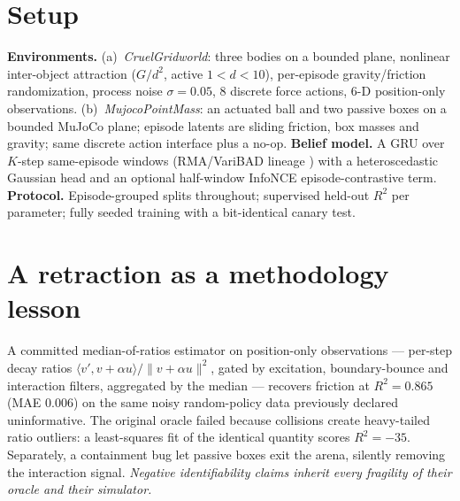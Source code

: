 \documentclass[10pt]{article}
\begin{document}
\section{Setup}
\textbf{Environments.} (a)~\emph{CruelGridworld}: three bodies on a bounded plane,
nonlinear inter-object attraction ($G/d^2$, active $1{<}d{<}10$), per-episode
gravity/friction randomization, process noise $\sigma{=}0.05$, 8 discrete force
actions, 6-D position-only observations. (b)~\emph{MujocoPointMass}: an actuated
ball and two passive boxes on a bounded MuJoCo plane; episode latents are sliding
friction, box masses and gravity; same discrete action interface plus a no-op.
\textbf{Belief model.} A GRU over $K$-step same-episode windows (RMA/VariBAD
lineage \citep{kumar2021rma,zintgraf2020varibad}) with a heteroscedastic Gaussian
head and an optional half-window InfoNCE episode-contrastive term.
\textbf{Protocol.} Episode-grouped splits throughout; supervised held-out $R^2$
per parameter; fully seeded training with a bit-identical canary test.

\section{A retraction as a methodology lesson}
A committed median-of-ratios estimator on position-only observations --- per-step
decay ratios $\langle v', v{+}\alpha u\rangle/\lVert v{+}\alpha u\rVert^2$, gated
by excitation, boundary-bounce and interaction filters, aggregated by the median
--- recovers friction at $R^2{=}0.865$ (MAE $0.006$) on the same noisy
random-policy data previously declared uninformative. The original oracle failed
because collisions create heavy-tailed ratio outliers: a least-squares fit of the
identical quantity scores $R^2{=}-35$. Separately, a containment bug let passive
boxes exit the arena, silently removing the interaction signal. \emph{Negative
identifiability claims inherit every fragility of their oracle and their
simulator.}
\end{document}
